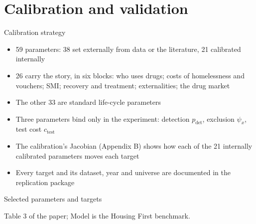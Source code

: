 \documentclass[aspectratio=169,11pt]{beamer}
\newcommand{\HF}{Housing First}
\newcommand{\source}[1]{\par\vfill{\color{lgrey}\tiny #1}}
\begin{document}
\section{Calibration and validation}

\begin{frame}{Calibration strategy}
\begin{itemize}\setlength\itemsep{0.5em}
\item 59 parameters: 38 set externally from data or the literature, 21 calibrated internally
\item 26 carry the story, in six blocks: who uses drugs; costs of homelessness and vouchers; SMI; recovery and treatment; externalities; the drug market
\item The other 33 are standard life-cycle parameters
\item Three parameters bind only in the experiment: detection $p_{\text{det}}$, exclusion $\psi_x$, test cost $c_{\text{test}}$
\item The calibration's Jacobian (Appendix B) shows how each of the 21 internally calibrated parameters moves each target
\item Every target and its dataset, year and universe are documented in the replication package
\end{itemize}
\end{frame}

\begin{frame}{Selected parameters and targets}
\centering\footnotesize
\resizebox{\textwidth}{!}{}
\source{Table 3 of the paper; Model is the \HF{} benchmark.}
\end{frame}
\end{document}
